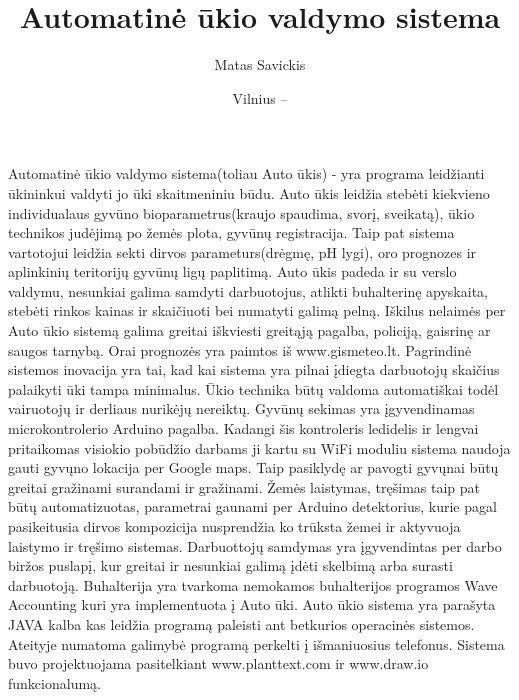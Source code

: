 \documentclass[oneside]{VUMIFPSkursinis}
\title{Automatinė ūkio valdymo sistema}
\author{Matas Savickis}
\date{Vilnius – \the\year}
\begin{document}
\maketitle

\tableofcontents


\centering	
{}
Automatinė ūkio valdymo sistema(toliau Auto ūkis) - yra programa leidžianti ūkininkui valdyti jo ūki skaitmeniniu būdu. Auto ūkis  leidžia stebėti kiekvieno individualaus gyvūno bioparametrus(kraujo spaudima, svorį, sveikatą), ūkio technikos judėjimą po žemės plota, gyvūnų registracija. Taip pat sistema vartotojui leidžia sekti dirvos parameturs(drėgmę, pH lygi),  oro prognozes ir aplinkinių teritorijų gyvūnų ligų paplitimą. Auto ūkis padeda ir su verslo valdymu, nesunkiai galima samdyti darbuotojus, atlikti buhalterinę apyskaita, stebėti rinkos kainas ir skaičiuoti bei numatyti galimą pelną. Iškilus nelaimės per Auto ūkio sistemą galima greitai iškviesti greitąją pagalba, policiją, gaisrinę ar saugos tarnybą. Orai prognozės yra paimtos iš www.gismeteo.lt. Pagrindinė sistemos inovacija yra tai, kad kai sistema yra pilnai įdiegta darbuotojų skaičius palaikyti ūki tampa minimalus. Ūkio technika būtų valdoma automatiškai todėl vairuotojų ir derliaus nurikėjų nereiktų. Gyvūnų sekimas yra įgyvendinamas microkontrolerio Arduino pagalba. Kadangi šis kontroleris ledidelis ir lengvai pritaikomas visiokio pobūdžio darbams ji kartu su WiFi moduliu sistema naudoja gauti gyvųno lokacija per Google maps. Taip pasiklydę ar pavogti gyvųnai būtų greitai gražinami surandami ir gražinami. Žemės laistymas, tręšimas taip pat būtų automatizuotas, parametrai gaunami per Arduino detektorius, kurie pagal pasikeitusia dirvos kompozicija nusprendžia ko trūksta žemei ir aktyvuoja laistymo ir tręšimo sistemas. Darbuottojų samdymas yra įgyvendintas per darbo biržos puslapį, kur greitai ir nesunkiai galimą įdėti skelbimą arba surasti darbuotoją. Buhalterija yra tvarkoma nemokamos buhalterijos programos Wave Accounting kuri yra implementuota į Auto ūki.  Auto ūkio sistema yra parašyta JAVA kalba kas leidžia programą paleisti ant betkurios operacinės sistemos. Ateityje numatoma galimybė programą perkelti į išmaniuosius telefonus. Sistema buvo projektuojama pasitelkiant www.planttext.com ir www.draw.io funkcionalumą.
\end{document}
